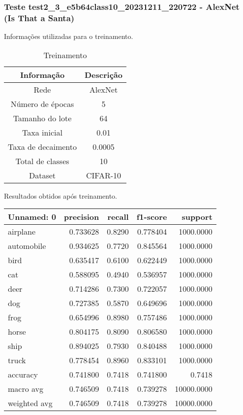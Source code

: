 \subsubsection{Teste test2_3_e5b64class10_20231211_220722 - AlexNet (Is That a Santa)}

Informações utilizadas para o treinamento.

\begin{table}[ht]
   \centering
   \caption{Treinamento}
   \label{tab:modelos}
   \begin{tabular}{| c | c | }
      \hline 
      \textbf{Informação} & \textbf{Descrição} \\
      \hline \hline 
      Rede & AlexNet \\
      \hline
      Número de épocas & 5\\
      \hline
      Tamanho do lote & 64\\
      \hline
      Taxa inicial & 0.01 \\
      \hline
      Taxa de decaimento & 0.0005 \\
      \hline
      Total de classes & 10\\
      \hline
      Dataset & CIFAR-10\\
      \hline
   \end{tabular} 
\end{table}

Resultados obtidos após treinamento.

\begin{tabular}{lrrrr}
\toprule
  Unnamed: 0 &  precision &  recall &  f1-score &    support \\
\midrule
    airplane &   0.733628 &  0.8290 &  0.778404 &  1000.0000 \\
  automobile &   0.934625 &  0.7720 &  0.845564 &  1000.0000 \\
        bird &   0.635417 &  0.6100 &  0.622449 &  1000.0000 \\
         cat &   0.588095 &  0.4940 &  0.536957 &  1000.0000 \\
        deer &   0.714286 &  0.7300 &  0.722057 &  1000.0000 \\
         dog &   0.727385 &  0.5870 &  0.649696 &  1000.0000 \\
        frog &   0.654996 &  0.8980 &  0.757486 &  1000.0000 \\
       horse &   0.804175 &  0.8090 &  0.806580 &  1000.0000 \\
        ship &   0.894025 &  0.7930 &  0.840488 &  1000.0000 \\
       truck &   0.778454 &  0.8960 &  0.833101 &  1000.0000 \\
    accuracy &   0.741800 &  0.7418 &  0.741800 &     0.7418 \\
   macro avg &   0.746509 &  0.7418 &  0.739278 & 10000.0000 \\
weighted avg &   0.746509 &  0.7418 &  0.739278 & 10000.0000 \\
\bottomrule
\end{tabular}


